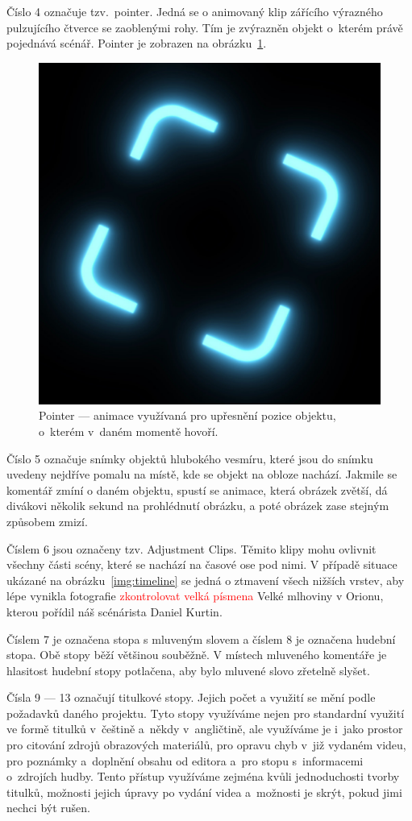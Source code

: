 \documentclass[12pt,a4paper,titlepage]{article}
\begin{document}
Číslo 4 označuje tzv.\ pointer. Jedná se o animovaný klip zářícího výrazného pulzujícího čtverce se zaoblenými rohy. Tím je zvýrazněn objekt o~kterém právě pojednává scénář. Pointer je zobrazen na obrázku~\ref{img:pointer}. 

\begin{figure}[H]
	\centering
	\includegraphics[width=.5\textwidth]{pointer.eps}
	\caption{Pointer --- animace využívaná pro upřesnění pozice objektu, o~kterém v~daném momentě hovoří.}\label{img:pointer}
\end{figure}

Číslo 5 označuje snímky objektů hlubokého vesmíru, které jsou do snímku uvedeny nejdříve pomalu na místě, kde se objekt na obloze nachází. Jakmile se komentář zmíní o daném objektu, spustí se animace, která obrázek zvětší, dá divákovi několik sekund na prohlédnutí obrázku, a poté obrázek zase stejným způsobem zmizí.

Číslem 6 jsou označeny tzv. Adjustment Clips. Těmito klipy mohu ovlivnit všechny části scény, které se nachází na časové ose pod nimi. V případě situace ukázané na obrázku~\ref{img:timeline} se jedná o ztmavení všech nižších vrstev, aby lépe vynikla fotografie \textcolor{red}{zkontrolovat velká písmena} Velké mlhoviny v Orionu, kterou pořídil náš scénárista Daniel Kurtin.

Číslem 7 je označena stopa s mluveným slovem a číslem 8 je označena hudební stopa. Obě stopy běží většinou souběžně. V místech mluveného komentáře je hlasitost hudební stopy potlačena, aby bylo mluvené slovo zřetelně slyšet.

Čísla 9 --- 13 označují titulkové stopy. Jejich počet a využití se mění podle požadavků daného projektu. Tyto stopy využíváme nejen pro standardní využití ve formě titulků v~češtině a~někdy v~angličtině, ale využíváme je i~jako prostor pro citování zdrojů obrazových materiálů, pro opravu chyb v~již vydaném videu, pro poznámky a~doplnění obsahu od editora a~pro stopu s~informacemi o~zdrojích hudby. Tento přístup využíváme zejména kvůli jednoduchosti tvorby titulků, možnosti jejich úpravy po vydání videa a~možnosti je skrýt, pokud jimi nechci být rušen. 
\end{document}
